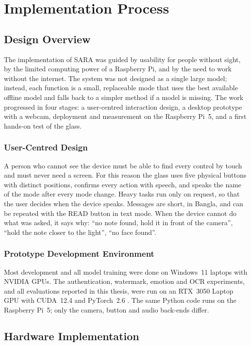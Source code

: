 \clearpage
\chapter{Implementation Process}
\label{chap:implementation}

\section{Design Overview}

The implementation of SARA was guided by usability for people without sight, by the limited computing power of a Raspberry Pi, and by the need to work without the internet. The system was not designed as a single large model; instead, each function is a small, replaceable mode that uses the best available offline model and falls back to a simpler method if a model is missing. The work progressed in four stages: a user-centred interaction design, a desktop prototype with a webcam, deployment and measurement on the Raspberry Pi~5, and a first hands-on test of the glass.

\subsection{User-Centred Design}
A person who cannot see the device must be able to find every control by touch and must never need a screen. For this reason the glass uses five physical buttons with distinct positions, confirms every action with speech, and speaks the name of the mode after every mode change. Heavy tasks run only on request, so that the user decides when the device speaks. Messages are short, in Bangla, and can be repeated with the READ button in text mode. When the device cannot do what was asked, it says why: ``no note found, hold it in front of the camera'', ``hold the note closer to the light'', ``no face found''.

\subsection{Prototype Development Environment}
Most development and all model training were done on Windows~11 laptops with NVIDIA GPUs. The authentication, watermark, emotion and OCR experiments, and all evaluations reported in this thesis, were run on an RTX~3050 Laptop GPU with CUDA~12.4 and PyTorch~2.6 \cite{pytorch}. The same Python code runs on the Raspberry Pi~5; only the camera, button and audio back-ends differ.

\section{Hardware Implementation}

